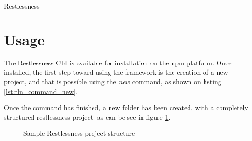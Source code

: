 \begin{chapter}{Restlessness}
    \section{Usage}
    \label{sec:rln_project_usage}

    The Restlessness CLI is available for installation on the npm platform. Once
    installed, the first step toward using the framework is the creation of a new
    project, and that is possible using the \textit{new} command, as shown
    on listing \ref{lst:rln_command_new}.

    \bigskip

    Once the command has finished, a new folder has been created, with a completely
    structured restlessness project, as can be see in figure
    \ref{fig:sample_rln_project_folder}.

    \begin{figure}
        \begin{minipage}{\linewidth}
        \end{minipage}
        \caption{Sample Restlessness project structure}
        \label{fig:sample_rln_project_folder}
    \end{figure}


\end{chapter}
